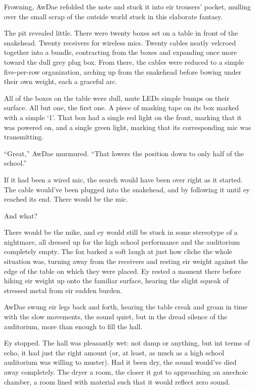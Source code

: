 Frowning, AwDae refolded the note and stuck it into eir trousers' pocket, mulling over the small scrap of the outside world stuck in this elaborate fantasy.

\secdiv

The pit revealed little.  There were twenty boxes set on a table in front of the snakehead.  Twenty receivers for wireless mics.  Twenty cables neatly velcroed together into a bundle, contracting from the boxes and expanding once more toward the dull grey plug box.  From there, the cables were reduced to a simple five-per-row organization, arching up from the snakehead before bowing under their own weight, each a graceful arc.

All of the boxes on the table were dull, mute LEDs simple bumps on their surface.  All but one, the first one.  A piece of masking tape on its box marked with a simple `1'.  That box had a single red light on the front, marking that it was powered on, and a single green light, marking that its corresponding mic was transmitting.

``Great,'' AwDae murmured.  ``That lowers the position down to only half of the school.''

If it had been a wired mic, the search would have been over right as it started.  The cable would've been plugged into the snakehead, and by following it until ey reached its end.  There would be the mic.

And what?

There would be the mike, and ey would still be stuck in some stereotype of a nightmare, all dressed up for the high school performance and the auditorium completely empty.  The fox barked a soft laugh at just how cliche the whole situation was, turning away from the receivers and resting eir weight against the edge of the table on which they were placed.  Ey rested a moment there before hiking eir weight up onto the familiar surface, hearing the slight squeak of stressed metal from eir sudden burden.

AwDae swung eir legs back and forth, hearing the table creak and groan in time with the slow movements, the sound quiet, but in the dread silence of the auditorium, more than enough to fill the hall.

Ey stopped.  The hall was pleasantly wet: not damp or anything, but int terms of echo, it had just the right amount (or, at least, as much as a high school auditorium was willing to muster).  Had it been dry, the sound would've died away completely.  The dryer a room, the closer it got to approaching an anechoic chamber, a room lined with material such that it would reflect zero sound.

